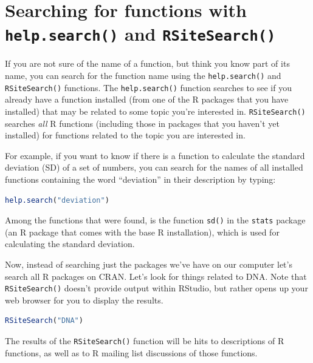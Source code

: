 \documentclass[
]{book}
\newcommand{\passthrough}[1]{#1}
\begin{document}
\hypertarget{searching-for-functions-with-help.search-and-rsitesearch}{%
\section{\texorpdfstring{Searching for functions with \texttt{help.search()} and \texttt{RSiteSearch()}}{Searching for functions with help.search() and RSiteSearch()}}\label{searching-for-functions-with-help.search-and-rsitesearch}}

If you are not sure of the name of a function, but think you know part of its name, you can search for the function name using the \passthrough{\lstinline!help.search()!} and \passthrough{\lstinline!RSiteSearch()!} functions. The \passthrough{\lstinline!help.search()!} function searches to see if you already have a function installed (from one of the R packages that you have installed) that may be related to some topic you're interested in. \passthrough{\lstinline!RSiteSearch()!} searches \emph{all} R functions (including those in packages that you haven't yet installed) for functions related to the topic you are interested in.

For example, if you want to know if there is a function to calculate the standard deviation (SD) of a set of numbers, you can search for the names of all installed functions containing the word ``deviation'' in their description by typing:

\begin{lstlisting}[language=R]
help.search("deviation")
\end{lstlisting}

Among the functions that were found, is the function \passthrough{\lstinline!sd()!} in the \passthrough{\lstinline!stats!} package (an R package that comes with the base R installation), which is used for calculating the standard deviation.

Now, instead of searching just the packages we've have on our computer let's search all R packages on CRAN. Let's look for things related to DNA. Note that \passthrough{\lstinline!RSiteSearch()!} doesn't provide output within RStudio, but rather opens up your web browser for you to display the results.

\begin{lstlisting}[language=R]
RSiteSearch("DNA")
\end{lstlisting}

The results of the \passthrough{\lstinline!RSiteSearch()!} function will be hits to descriptions of R functions, as well as to R mailing list discussions of those functions.
\end{document}

